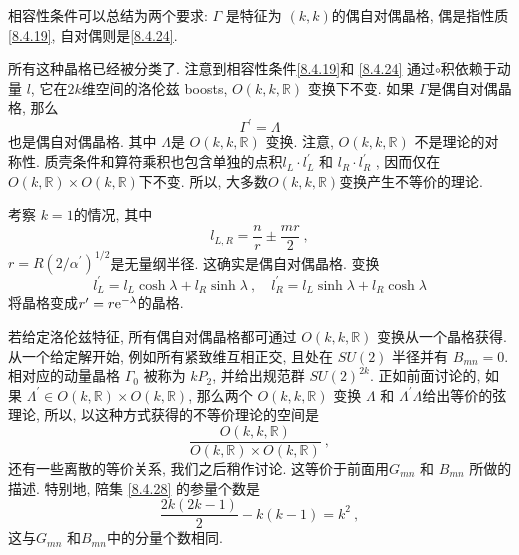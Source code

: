 相容性条件可以总结为两个要求: $\Gamma$ 是特征为 $(k, k)$的偶自对偶晶格, 偶是指性质\eqref{8.4.19}, 自对偶则是\eqref{8.4.24}.

所有这种晶格已经被分类了. 注意到相容性条件\eqref{8.4.19}和 \eqref{8.4.24} 通过$\vysmwhtcircle$积依赖于动量 $l$, 
它在$2 k$维空间的洛伦兹 boosts,  $O(k, k, \mathds{R})$ 变换下不变. 如果 $\Gamma$是偶自对偶晶格, 那么
\begin{equation}
	\Gamma^{\prime}=\Lambda \label{8.4.25}
\end{equation}
也是偶自对偶晶格. 其中 $\Lambda $是 $O(k, k, \mathds{R})$ 变换. 注意, $O(k, k, \mathds{R})$ 不是理论的对称性. 质壳条件和算符乘积也包含单独的点积$l_{L} \cdot l_{L}^{\prime}$ 和 $l_{R} \cdot l_{R}^{\prime}$ , 因而仅在 $O(k, \mathds{R}) \times O(k, \mathds{R})$下不变. 所以, 
大多数$O(k, k, \mathds{R})$变换产生不等价的理论.

考察 $k=1$的情况, 其中
\begin{equation}
	l_{L, R}=\frac{n}{r} \pm \frac{m r}{2} \:, \label{8.4.26}
\end{equation}
 $r=R(2 / \alpha^{\prime})^{1 / 2}$是无量纲半径. 这确实是偶自对偶晶格. 变换
\begin{equation}
	l_{L}^{\prime}=l_{L} \cosh \lambda+l_{R} \sinh \lambda\:, \quad l_{R}^{\prime}=l_{L} \sinh \lambda+l_{R} \cosh \lambda \label{8.4.27}
\end{equation}
将晶格变成$r^{\prime}=r \mathrm{e}^{-\lambda}$的晶格.

若给定洛伦兹特征, 所有偶自对偶晶格都可通过 $O(k, k, \mathds{R})$ 变换从一个晶格获得. 从一个给定解开始, 例如所有紧致维互相正交, 
且处在 $S U(2)$ 半径并有 $B_{m n}=0 $. 相对应的动量晶格 $\Gamma_{0}$ 被称为 $k P_{2}$, 并给出规范群 $S U(2)^{2 k}$. 
正如前面讨论的, 如果 $\Lambda^{\prime} \in O(k, \mathds{R}) \times O(k, \mathds{R})$, 
那么两个 $O(k, k, \mathds{R})$ 变换 $\Lambda$ 和 $\Lambda^{\prime} \Lambda$给出等价的弦理论, 所以, 以这种方式获得的不等价理论的空间是
\begin{equation}
	\frac{O(k, k, \mathds{R})}{O(k, \mathds{R}) \times O(k, \mathds{R})} \:, \label{8.4.28}
\end{equation}
还有一些离散的等价关系, 我们之后稍作讨论. 这等价于前面用$G_{m n}$ 和 $B_{m n} $ 所做的描述. 特别地, 陪集 \eqref{8.4.28} 的参量个数是
\begin{equation}
	\frac{2 k(2 k-1)}{2}-k(k-1)=k^{2} \:, \label{8.4.29}
\end{equation}
这与$G_{m n}$ 和$B_{m n}$中的分量个数相同.

